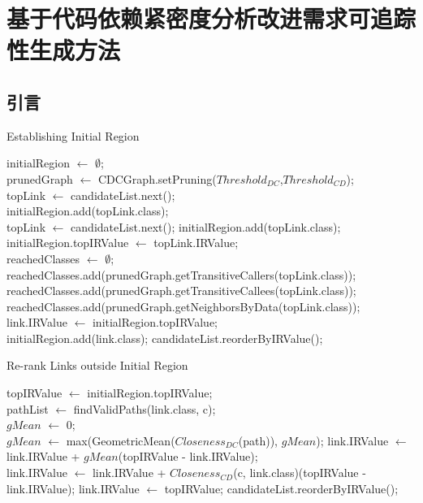 \chapter{基于代码依赖紧密度分析改进需求可追踪性生成方法}

\section{引言}



\begin{algorithm}[htbp]
\caption{Establishing Initial Region}
\label{alg:EstablishingInitialRegion}
initialRegion $\leftarrow$ $\emptyset$;\\
prunedGraph $\leftarrow$ CDCGraph.setPruning($Threshold_{DC}$,$Threshold_{CD}$);\\
topLink $\leftarrow$ candidateList.next();\\
 {
	initialRegion.add(topLink.class);\\
	topLink $\leftarrow$ candidateList.next();
} 
initialRegion.add(topLink.class);\\
initialRegion.topIRValue $\leftarrow$ topLink.IRValue;\\
reachedClasses $\leftarrow$ $\emptyset$;\\
reachedClasses.add(prunedGraph.getTransitiveCallers(topLink.class));\\
reachedClasses.add(prunedGraph.getTransitiveCallees(topLink.class));\\
reachedClasses.add(prunedGraph.getNeighborsByData(topLink.class));\\
{
   	 {
   		link.IRValue $\leftarrow$ initialRegion.topIRValue;\\
   		initialRegion.add(link.class);
   	}
}
candidateList.reorderByIRValue();\\
\end{algorithm}


\begin{algorithm}[htbp]
\caption{Re-rank Links outside Initial Region}
\label{alg:Re-rankLinksOutsideInitialRegion}
topIRValue $\leftarrow$ initialRegion.topIRValue;\\
 {
	 {
   		 {
        	pathList $\leftarrow$ findValidPaths(link.class, c);\\
          	$gMean$ $\leftarrow$ 0;\\
          	 {
            	$gMean$ $\leftarrow$ max(GeometricMean($Closeness_{DC}$(path)), $gMean$);
          	}
          	link.IRValue $\leftarrow$ link.IRValue + $gMean$(topIRValue - link.IRValue);\\
           	 {
            	link.IRValue $\leftarrow$ link.IRValue + $Closeness_{CD}$(c, link.class)(topIRValue - link.IRValue);
          	}
      	}
      	 {
       		link.IRValue $\leftarrow$ topIRValue;
        }
    }
}
candidateList.reorderByIRValue();
\end{algorithm}

